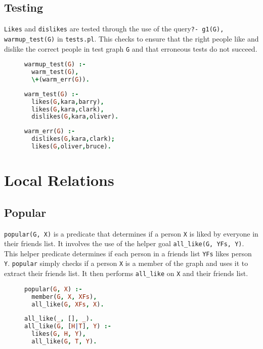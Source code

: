 \documentclass{article}
\begin{document}
\subsection{Testing}
\texttt{Likes} and \texttt{dislikes} are tested through the use of the query\texttt{?- g1(G), warmup\_test(G)} in \texttt{tests.pl}. This checks to ensure that the right people like and dislike the correct people in test graph \texttt{G} and that erroneous tests do not succeed.
\begin{figure}[h!]
\begin{minipage}{0.33\textwidth}
\begin{lstlisting}[language=Prolog]
warmup_test(G) :-
  warm_test(G),
  \+(warm_err(G)).
\end{lstlisting}
\end{minipage}
\begin{minipage}{0.33\textwidth}
\begin{lstlisting}[language=Prolog]
warm_test(G) :-
  likes(G,kara,barry),
  likes(G,kara,clark),
  dislikes(G,kara,oliver).
\end{lstlisting}
\end{minipage}
\begin{minipage}{0.33\textwidth}
\begin{lstlisting}[language=Prolog]
warm_err(G) :-
  dislikes(G,kara,clark);
  likes(G,oliver,bruce).
\end{lstlisting}
\end{minipage}
\end{figure}
\section{Local Relations}

\subsection{Popular}
\texttt{popular(G, X)} is a predicate that determines if a person \texttt{X} is liked by everyone in their friends list. It involves the use of the helper goal \texttt{all\_like(G, YFs, Y)}. This helper predicate determines if each person in a friends list \texttt{YFs} likes person \texttt{Y}. \texttt{popular} simply checks if a person \texttt{X} is a member of the graph and uses it to extract their friends list. It then performs \texttt{all\_like} on \texttt{X} and their friends list.
\begin{figure}[h!]
\begin{minipage}{0.5\textwidth}
\begin{lstlisting}[language=Prolog]
popular(G, X) :-
  member(G, X, XFs),
  all_like(G, XFs, X).
\end{lstlisting}
\end{minipage}
\begin{minipage}{0.5\textwidth}
\begin{lstlisting}[language=Prolog]
all_like(_, [], _).
all_like(G, [H|T], Y) :-
  likes(G, H, Y),
  all_like(G, T, Y).
\end{lstlisting}
\end{minipage}
\end{figure}
\end{document}
